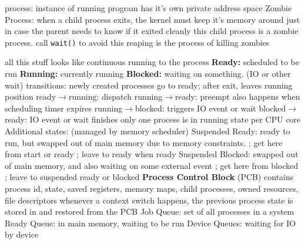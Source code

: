 \documentclass[12pt]{article}
\begin{document}
\begin{spacing}{0.6}
\begin{multicols*}{2}
\begin{flushleft}
\begin{outline}[longenum]
  \1 process: instance of running program
  \1 has it's own private address space 
  \1 Zombie Process: when a child process exits, the kernel must keep it's memory around just in case the parent needs to know if it exited cleanly
    \2 this child process is a zombie process.
    \2 call \verb|wait()| to avoid this
    \2 reaping is the process of killing zombies



  \1 all this stuff looks like continuous running to the process
  \1 \textbf{Ready:} scheduled to be run
  \1 \textbf{Running:} currently running
  \1 \textbf{Blocked:} waiting on something. (IO or other wait)
  \1 transitions:
    \2 newly created processes go to ready; after exit, leaves running position
    \2 ready$\rightarrow$running: dispatch
    \2 running$\rightarrow$ready: preempt
      \3 also happens when scheduling timer expires
    \2 running$\rightarrow$blocked: triggers IO event or wait
    \2 blocked$\rightarrow$ready: IO event or wait finishes
  \1 only one process is in running state per CPU core
  \1 Additional states: (managed by memory scheduler)
    \2 Suspended Ready: ready to run, but swapped out of main memory due to memory constraints.
      ; get here from start or ready
      ; leave to ready when ready
    \2 Suspended Blocked: swapped out of main memory, and also waiting on some external event
      ; get here from blocked
      ; leave to suspended ready or blocked
  \1 \textbf{Process Control Block} (PCB)
    \2 contains process id, state, saved registers, memory maps, child processes, owned resources, file descriptors
    \2 whenever a context switch happens, the previous process state is stored in and restored from the PCB
  \1 Job Queue: set of all processes in a system
  \1 Ready Queue: in main memory, waiting to be run
  \1 Device Queues: waiting for IO by device


\end{outline}
\end{flushleft}
\end{multicols*}
\end{spacing}
\end{document}
